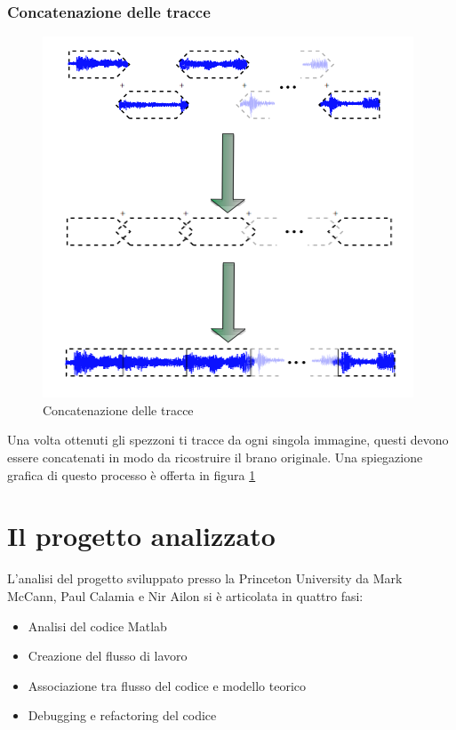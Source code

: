 \subsubsection{Concatenazione delle tracce}
\begin{figure}[h!t]
\begin{center}
\includegraphics[scale=0.4]{./img/concatenation.png}
\caption{Concatenazione delle tracce}\label{fading}
\end{center}
\end{figure}
Una volta ottenuti gli spezzoni ti tracce da ogni singola immagine, questi devono essere concatenati in modo da ricostruire il brano originale. Una spiegazione grafica di questo processo \`e offerta in figura \ref{fading}
\section{Il progetto analizzato}
L'analisi del progetto sviluppato presso la Princeton University da Mark McCann, Paul Calamia e Nir Ailon si \`e articolata in quattro fasi:
\begin{itemize}
\item Analisi del codice Matlab
\item Creazione del flusso di lavoro
\item Associazione tra flusso del codice e modello teorico
\item Debugging e refactoring del codice
\end{itemize}

